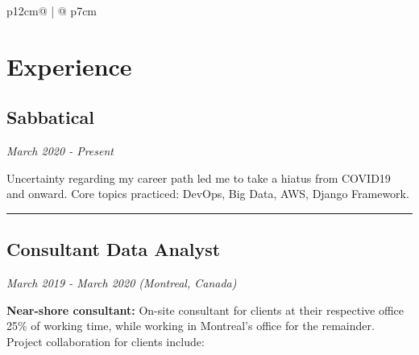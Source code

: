 \documentclass[letterpaper, 11pt]{article}
\begin{document}
\begin{tabular}{p{12cm}@{\hspace{1em}} | @{\hspace{1em}} p{7cm}}
    \section*{Experience}

        \subsection*{Sabbatical}
            \hspace{2em} \textit{March 2020 - Present}
            \vspace{0.3em}
            \begin{adjustwidth}{1em}{1em}
                Uncertainty regarding my career path led me to take a hiatus from COVID19 and onward. Core topics practiced: DevOps, Big Data, AWS, Django Framework.
            
            \end{adjustwidth}

            \begin{adjustwidth}{4em}{4em}
                {\color{lightgray}\rule{\linewidth}{1pt}}           
            \end{adjustwidth}
        \subsection*{Consultant Data Analyst}
            
            \hspace{1em}{\large IBM Client Innovation Center}
            
            \hspace{2em}\textit{March 2019 - March 2020  (Montreal, Canada)}

            \vspace{0.3em}

            \begin{adjustwidth}{1em}{1em}
                \textbf{Near-shore consultant:} On-site consultant for clients at their respective office 25\% of working time, while working in Montreal's office for the remainder. Project collaboration for clients include:


\end{adjustwidth}
\end{tabular}
\end{document}
